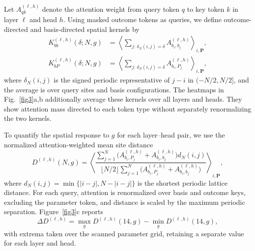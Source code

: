 \documentclass[pdflatex,sn-nature]{sn-jnl}%
\theoremstyle{thmstyleone}%
\theoremstyle{thmstyletwo}%
\theoremstyle{thmstylethree}%
\begin{document}
Let \(A_{qk}^{(\ell,h)}\) denote the attention weight from query token \(q\) to key token \(k\) in layer \(\ell\) and head \(h\). Using masked outcome tokens as queries, we define outcome-directed and basis-directed spatial kernels by
\begin{equation}
\label{eq:attention_outcome_kernel}
\begin{aligned}
K_{bb}^{(\ell,h)}(\delta;N,g)
&=\left\langle
\sum_{j:\,\delta_N(i,j)=\delta} A_{b_i,b_j}^{(\ell,h)}
\right\rangle_{i,\mathbf{P}},\\
K_{bP}^{(\ell,h)}(\delta;N,g)
&=\left\langle
\sum_{j:\,\delta_N(i,j)=\delta} A_{b_i,P_j}^{(\ell,h)}
\right\rangle_{i,\mathbf{P}},
\end{aligned}
\end{equation}
where \(\delta_N(i,j)\) is the signed periodic representative of \(j-i\) in \((-N/2,N/2]\), and the average is over query sites and basis configurations. The heatmaps in Fig.~\ref{fig3}a,b additionally average these kernels over all layers and heads. They show attention mass directed to each token type without separately renormalizing the two kernels.

To quantify the spatial response to \(g\) for each layer--head pair, we use the normalized attention-weighted mean site distance
\begin{equation}
\label{eq:attention_site_distance}
D^{(\ell,h)}(N,g)
=\left\langle
\frac{\sum_{j=1}^{N}
\bigl(A_{b_i,P_j}^{(\ell,h)}+A_{b_i,b_j}^{(\ell,h)}\bigr)d_N(i,j)}
{\lfloor N/2\rfloor\sum_{j=1}^{N}
\bigl(A_{b_i,P_j}^{(\ell,h)}+A_{b_i,b_j}^{(\ell,h)}\bigr)}
\right\rangle_{i,\mathbf{P}},
\end{equation}
where \(d_N(i,j)=\min\{|i-j|,N-|i-j|\}\) is the shortest periodic lattice distance. For each query, attention is renormalized over basis and outcome keys, excluding the parameter token, and distance is scaled by the maximum periodic separation. Figure~\ref{fig3}c reports
\begin{equation}
\label{eq:attention_distance_variation}
\Delta D^{(\ell,h)}
=\max_g D^{(\ell,h)}(14,g)-\min_g D^{(\ell,h)}(14,g),
\end{equation}
with extrema taken over the scanned parameter grid, retaining a separate value for each layer and head.
\end{document}
